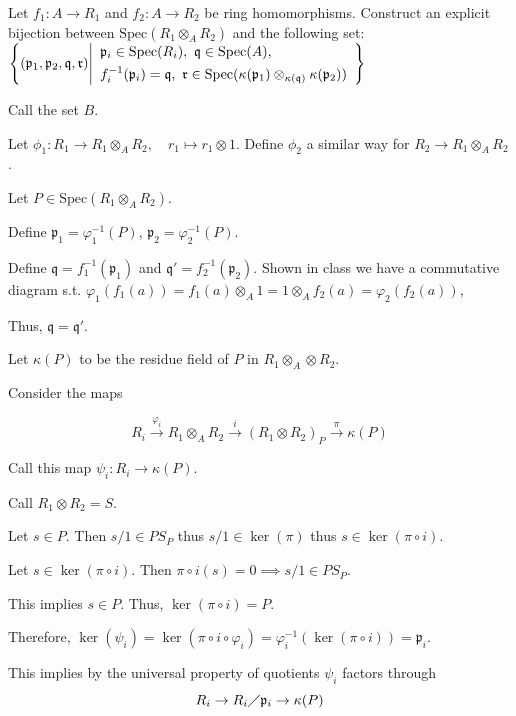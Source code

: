 \documentclass[12pt, letterpaper]{article}
\newcommand{\p}{\mathfrak{p}}
\newcommand{\Spec}{\mathrm{Spec}}
\newcommand{\mf}[1]{\mathfrak{#1}}
\begin{document}
\begin{problem}{}
    Let $f_1 : A \to R_1$ and $f_2 : A \to R_2$ be ring homomorphisms. Construct an explicit bijection
    between $\Spec(R_1 \otimes_A R_2)$ and the following set:
    $\left\{   (\p_1, \p_2, \mf{q}, \mf{r}) \Bigg| \\
    \begin{array}{l}
    \p_i \in \operatorname{Spec}(R_i),\ \mf{q} \in \operatorname{Spec}(A), \\[4pt]
    f_i^{-1}(\p_i) = \mf{q},\ \mf{r} \in \operatorname{Spec}(\kappa(\p_1)\otimes_{\kappa(\mf{q})}\kappa(\p_2))
    \end{array}
    \right\}$
\end{problem}
\begin{problemproof}
    Call the set $B$.
    
    Let $\phi_1 : R_1 \to R_1 \otimes_A R_2, \quad r_1 \mapsto r_1 \otimes 1$. Define $\phi_2$ a similar way for $R_2 \to R_1 \otimes_A R_2$.

    Let $P \in \Spec(R_1 \otimes_A R_2)$.

    Define $\p_1 = \varphi_1^{-1}(P)$, $\p_2 =\varphi_2^{-1}(P)$.

    Define $\mf{q} = f^{-1}_1(\p_1)$ and $\mf{q}' = f^{-1}_2(\p_2)$. Shown in class we have a commutative diagram s.t. $\varphi_1(f_1(a))=f_1(a) \otimes_A 1=1 \otimes_A f_2(a)=\varphi_2(f_2(a))$,

    Thus, $\mf{q}=\mf{q}'$.

    Let $\kappa(P)$ to be the residue field of $P$ in $R_1 \otimes_A \otimes R_2$.

    Consider the maps

    \[R_i \overset{\varphi_i}{\to} R_1 \otimes_A R_2 \overset{i}{\to} (R_1 \otimes R_2)_P \overset{\pi}{\to} \kappa(P)\]

    Call this map $\psi_i : R_i \to \kappa(P)$.

    Call $R_1 \otimes R_2 = S$.

    Let $s \in P$. Then $s/1 \in PS_P$ thus $s/1 \in \ker(\pi)$ thus $s \in \ker(\pi \circ i)$.

    Let $s \in \ker(\pi \circ i)$. Then $\pi \circ i(s) = 0 \implies s/1 \in PS_P$.

    This implies $s \in P$. Thus, $\ker(\pi \circ i) = P$.

    Therefore, $\ker(\psi_i)=\ker(\pi \circ i \circ \varphi_i) = \varphi_i^{-1}(\ker(\pi \circ i)) = \p_i$.

    This implies by the universal property of quotients $\psi_i$ factors through
    \[R_i \to R_i \diagup \p_i \to \kappa(P)\]


\end{problemproof}
\end{document}
